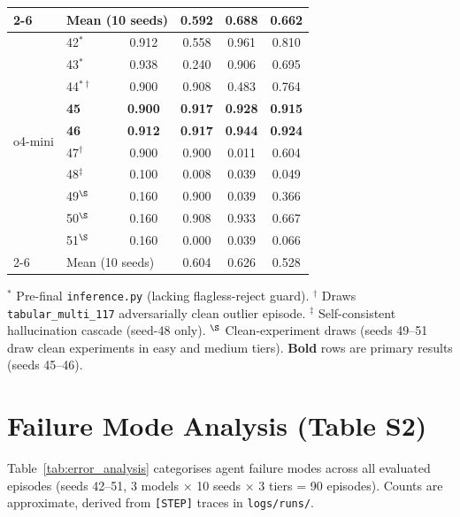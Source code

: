 \documentclass{article}
\begin{document}
\begin{table}[h]
\begin{tabular}{llcccc}
\cmidrule{2-6}
  & \multicolumn{2}{l}{\small Mean (10 seeds)} & \small 0.592 & \small 0.688 & \small 0.662 \\
\midrule
\multirow{10}{*}{o4-mini}
  & 42$^*$  & 0.912 & 0.558 & 0.961 & 0.810 \\
  & 43$^*$  & 0.938 & 0.240 & 0.906 & 0.695 \\
  & 44$^{\ast\dagger}$ & 0.900 & 0.908 & 0.483 & 0.764 \\
  & \textbf{45} & \textbf{0.900} & \textbf{0.917} & \textbf{0.928} & \textbf{0.915} \\
  & \textbf{46} & \textbf{0.912} & \textbf{0.917} & \textbf{0.944} & \textbf{0.924} \\
  & 47$^\dagger$ & 0.900 & 0.900 & 0.011 & 0.604 \\
  & 48$^\ddagger$ & 0.100 & 0.008 & 0.039 & 0.049 \\
  & 49$^\S$ & 0.160 & 0.900 & 0.039 & 0.366 \\
  & 50$^\S$ & 0.160 & 0.908 & 0.933 & 0.667 \\
  & 51$^\S$ & 0.160 & 0.000 & 0.039 & 0.066 \\
\cmidrule{2-6}
  & \multicolumn{2}{l}{\small Mean (10 seeds)} & \small 0.604 & \small 0.626 & \small 0.528 \\
\bottomrule
\end{tabular}

\medskip
\small{$^*$ Pre-final \texttt{inference.py} (lacking flagless-reject guard).
$^\dagger$ Draws \texttt{tabular\_multi\_117} adversarially clean outlier episode.
$^\ddagger$ Self-consistent hallucination cascade (seed-48 only).
$^\S$ Clean-experiment draws (seeds 49--51 draw clean experiments in easy and medium tiers).
\textbf{Bold} rows are primary results (seeds 45--46).}
\end{table}

\section{Failure Mode Analysis (Table S2)}
\label{sec:error-analysis}

Table~\ref{tab:error_analysis} categorises agent failure modes across all evaluated episodes
(seeds 42--51, 3 models × 10 seeds × 3 tiers = 90 episodes).
Counts are approximate, derived from \texttt{[STEP]} traces in \texttt{logs/runs/}.
\end{document}
